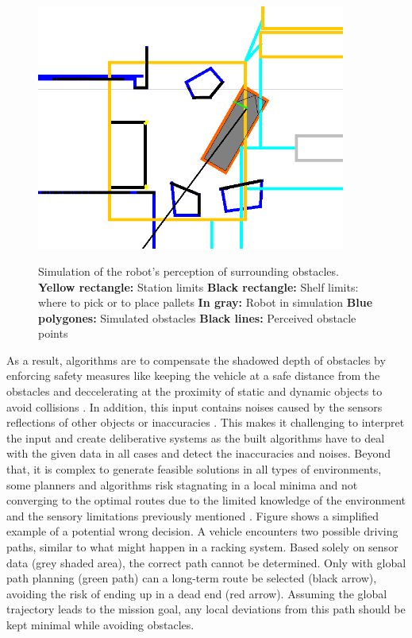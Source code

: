 \begin{figure}[H]
    \begin{center}
        \includegraphics[width=4in]{images/Chap1/scan.png}\\
        \caption{
        Simulation of the robot's perception of surrounding obstacles.
        \newline \textbf{Yellow rectangle:} Station limits
        \newline \textbf{Black rectangle:} Shelf limits: where to pick or to place pallets
        \newline \textbf{In gray:} Robot in simulation
        \newline \textbf{Blue polygones:} Simulated obstacles
        \newline \textbf{Black lines:} Perceived obstacle points}
        \label{scamSim}
        \end{center}
\end{figure}

As a result, algorithms are to compensate the shadowed depth of obstacles by enforcing safety measures like 
keeping the vehicle at a safe distance from the obstacles and deccelerating at the proximity 
of static and dynamic objects to avoid collisions .
In addition, this input contains noises caused by the sensors reflections of other objects
or inaccuracies . 
This makes it challenging to interpret the input and create deliberative systems as the built algorithms have to 
deal with the given data
in all cases and detect the inaccuracies and noises.
Beyond that, it is complex to generate feasible solutions in all types of environments,
some planners and algorithms risk stagnating in a local minima and not converging to the optimal routes
due to the limited knowledge of the environment and the sensory limitations previously mentioned . 
Figure  shows a simplified example of a potential wrong decision. A vehicle encounters two possible 
driving paths, similar to what might happen in a racking system. Based solely on sensor data 
(grey shaded area), the correct path cannot be determined. Only with global path planning (green path) 
can a long-term route be selected (black arrow), avoiding the risk of ending up in a dead end (red arrow). 
Assuming the global trajectory leads to the mission goal, any local deviations from this path should be 
kept minimal while avoiding obstacles.

